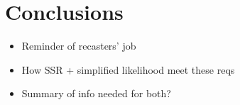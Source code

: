 \section{Conclusions}
\label{sec:conclusions}

\begin{itemize}
\item Reminder of recasters' job
\item How SSR + simplified likelihood meet these reqs
\item Summary of info needed for both?
\end{itemize}

